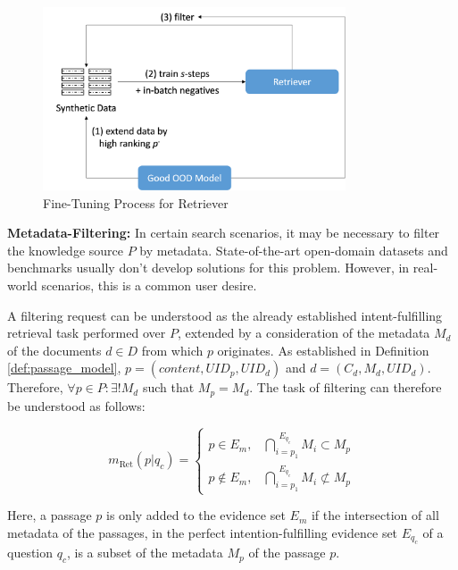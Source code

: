 \begin{figure}
   \centering
    \includegraphics[width=0.8\textwidth]{Grafiken/Training.png}
    \caption{Fine-Tuning Process for Retriever}
    \label{fig:retriever-fine-tuning} 
\end{figure}

\vspace{\baselineskip}

\textbf{Metadata-Filtering:} In certain search scenarios, it may be necessary to filter the knowledge source $P$ by metadata. State-of-the-art open-domain datasets and benchmarks usually don't develop solutions for this problem. However, in real-world scenarios, this is a common user desire.

A filtering request can be understood as the already established intent-fulfilling retrieval task performed over $P$, extended by a consideration of the metadata $M_d$ of the documents $d \in D$ from which $p$ originates. As established in Definition \ref{def:passage_model}, $p = (content, UID_p, UID_d)$ and $d = (C_d, M_d, UID_d)$. Therefore, $\forall p \in P: \exists! M_d$ such that $M_p = M_d$. The task of filtering can therefore be understood as follows:

\begin{equation}
    m_{\text{Ret}}(p|q_c) =
    \begin{cases}
        p \in E_m, & \bigcap\limits_{i=p_1}^{\substack{E_{q_c}}} M_{i} \subset M_p \\
        p \notin E_m, & \bigcap\limits_{i=p_1}^{\substack{E_{q_c}}} M_{i} \not\subset M_p
    \end{cases}
\end{equation}

Here, a passage $p$ is only added to the evidence set $E_m$ if the intersection of all metadata of the passages, in the perfect intention-fulfilling evidence set $E_{q_c}$ of a question $q_c$, is a subset of the metadata $M_p$ of the passage $p$.

